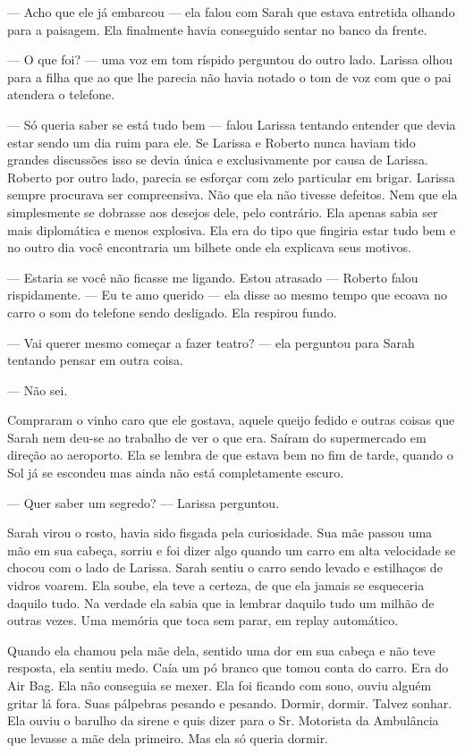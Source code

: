 --- Acho que ele já embarcou --- ela falou com Sarah que estava entretida olhando para a paisagem. Ela finalmente havia conseguido sentar no banco da frente.

--- O que foi? --- uma voz em tom ríspido perguntou do outro lado. Larissa olhou para a filha que ao que lhe parecia não havia notado o tom de voz com que o pai atendera o telefone.

--- Só queria saber se está tudo bem --- falou Larissa tentando entender que devia estar sendo um dia ruim para ele. Se Larissa e Roberto nunca haviam tido grandes discussões isso se devia única e exclusivamente por causa de Larissa. Roberto por outro lado, parecia se esforçar com zelo particular em brigar. Larissa sempre procurava ser compreensiva. Não que ela não tivesse defeitos. Nem que ela simplesmente se dobrasse aos desejos dele, pelo contrário. Ela apenas sabia ser mais diplomática e menos explosiva. Ela era do tipo que fingiria estar tudo bem e no outro dia você encontraria um bilhete onde ela explicava seus motivos.

--- Estaria se você não ficasse me ligando. Estou atrasado --- Roberto falou rispidamente.
--- Eu te amo querido --- ela disse ao mesmo tempo que ecoava no carro o som do telefone sendo desligado. Ela respirou fundo.

--- Vai querer mesmo começar a fazer teatro? --- ela perguntou para Sarah tentando pensar em outra coisa.

--- Não sei.

Compraram o vinho caro que ele gostava, aquele queijo fedido e outras coisas que Sarah nem deu-se ao trabalho de ver o que era. Saíram do supermercado em direção ao aeroporto. Ela se lembra de que estava bem no fim de tarde, quando o Sol já se escondeu mas ainda não está completamente escuro.

--- Quer saber um segredo? --- Larissa perguntou.

Sarah virou o rosto, havia sido fisgada pela curiosidade. Sua mãe passou uma mão em sua cabeça, sorriu e foi dizer algo quando um carro em alta velocidade se chocou com o lado de Larissa. Sarah sentiu o carro sendo levado e estilhaços de vidros voarem. Ela soube, ela teve a certeza, de que ela jamais se esqueceria daquilo tudo. Na verdade ela sabia que ia lembrar daquilo tudo um milhão de outras vezes. Uma memória que toca sem parar, em replay automático.

Quando ela chamou pela mãe dela, sentido uma dor em sua cabeça e não teve resposta, ela sentiu medo. Caía um pó branco que tomou conta do carro. Era do Air Bag. Ela não conseguia se mexer. Ela foi ficando com sono, ouviu alguém gritar lá fora. Suas pálpebras pesando e pesando. Dormir, dormir. Talvez sonhar. Ela ouviu o barulho da sirene e quis dizer para o Sr. Motorista da Ambulância que levasse a mãe dela primeiro. Mas ela só queria dormir.

